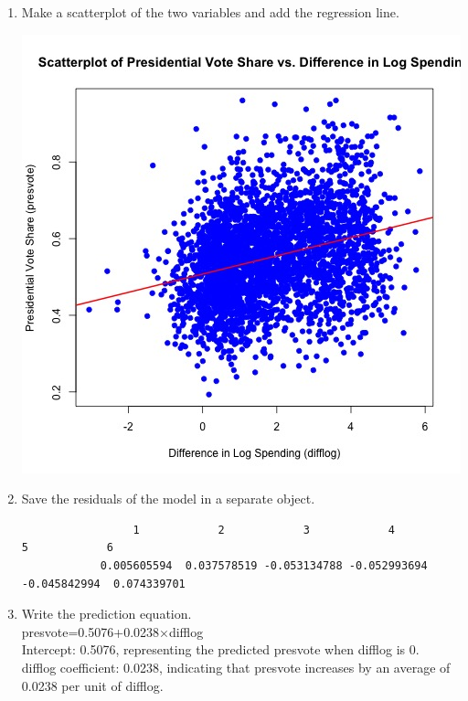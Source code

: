 \documentclass[12pt,letterpaper]{article}
\begin{document}
\begin{enumerate}
			
		\item Make a scatterplot of the two variables and add the regression line. 
			  
				\includegraphics[width=.85\textwidth]{scatterplot_presvote_difflog2.jpg}
			\vspace{5cm}
		
		\item Save the residuals of the model in a separate object.
			  
				\begin{verbatim}
			     1            2            3            4            5            6 
			0.005605594  0.037578519 -0.053134788 -0.052993694 -0.045842994  0.074339701 
			\end{verbatim} 
			\vspace{1cm}
			
		\item Write the prediction equation.\\
			presvote=0.5076+0.0238×difflog\\
			
			Intercept: 0.5076, representing the predicted presvote when difflog is 0.\\
			difflog coefficient: 0.0238, indicating that presvote increases by an average of 0.0238 per unit of difflog.\\
	
	\end{enumerate}
	
\end{document}
